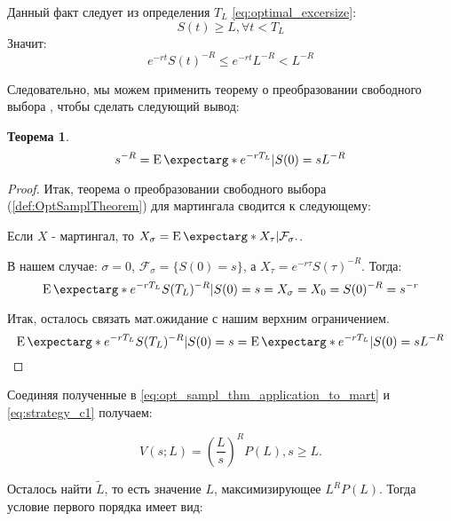 \documentclass[a4paper,12pt]{article}
\newtheorem{theorem}{Теорема}
\theoremstyle{definition}
\newcommand{\expect}{\operatorname{E}\expectarg}
\begin{document}
Данный факт следует из определения $T_L$ \eqref{eq:optimal_excersize}:
\begin{equation*}
S(t) \ge L, \forall t < T_L
\end{equation*}
Значит:
\begin{equation*}
e^{-rt}S(t)^{-R} \le e^{-rt}L^{-R} < L^{-R}
\end{equation*}

Следовательно, мы можем применить теорему о преобразовании свободного выбора \cite{bib:Shiryaev}, чтобы сделать следующий вывод:
\begin{theorem}
\begin{equation}\label{eq:opt_sampl_thm_application_to_mart}
s^{-R} = \expect*{e^{-rT_L} | S(0) = s} L^{-R}
\end{equation}
\end{theorem}
\begin{proof}
Итак, теорема о преобразовании свободного выбора (\autoref{def:OptSamplTheorem}) для мартингала сводится к следующему:

Если ${X}$ - мартингал, то ${X_\sigma=\expect*{X_{\tau} | \mathcal{F}_\sigma}.}$.

В нашем случае: $\sigma = 0$, $\mathcal{F}_\sigma = \{S(0) = s\}$, а $X_{\tau} = e^{-r\tau} S(\tau)^{-R}$. Тогда:
\begin{equation*}
    \expect*{e^{-rT_L} S(T_L)^{-R} | S(0) = s} = X_\sigma = X_0 = S(0)^{-R} = s^{-r}
\end{equation*}

Итак, осталось связать мат.ожидание с нашим верхним ограничением.
\begin{equation*}
     \expect*{e^{-rT_L} S(T_L)^{-R} | S(0) = s} = \expect*{e^{-rT_L} | S(0) = s} L^{-R}
\end{equation*}
\end{proof}

Соединяя полученные в \eqref{eq:opt_sampl_thm_application_to_mart} и \eqref{eq:strategy_c1} получаем:

\begin{equation}\label{eq:strategy_c1_simplified}
V(s; L) = \left(\frac{L}{s}\right)^{R} P(L), s \ge L.
\end{equation}

Осталось найти $\widetilde{L}$, то есть значение $L$, максимизирующее $L^{R} P(L)$. Тогда условие первого порядка имеет вид:

\end{document}

